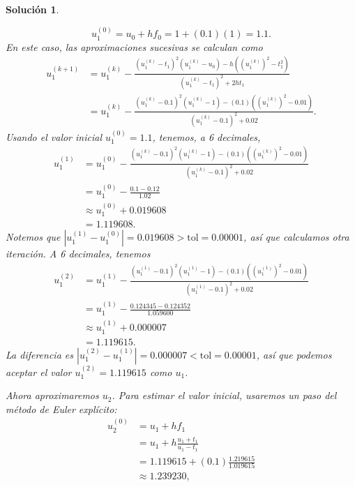 \documentclass[11pt,letterpaper]{article}
\newtheorem*{sol}{Solución}
\newcommand\tol{\mathrm{tol}}
\begin{document}
\begin{sol}
\begin{enumerate}
      \begin{equation}
        u_1^{(0)}=u_0 + h f_0 = 1 + (0.1)(1)=1.1
      .\end{equation}
      En este caso, las aproximaciones sucesivas se calculan como
      \begin{align}
        u_1^{(k+1)}
        &=
          u_{1}^{(k)}
          - \frac
          {
            (u_1^{(k)}-t_1)^{2}(u_{1}^{(k)} - u_{0})
            - h ((u_1^{(k)})^{2}-t_1^{2})
          }
          {
            (u_1^{(k)}-t_1)^{2} + 2ht_1
          }
          \\
        &=
          u_{1}^{(k)}
          - \frac
          {
            (u_1^{(k)}-0.1)^{2}(u_{1}^{(k)} - 1)
            - (0.1) ((u_1^{(k)})^{2}-0.01)
          }
          {
            (u_1^{(k)}-0.1)^{2} + 0.02
          }
      .\end{align}
      Usando el valor inicial $u_1^{(0)}=1.1$, tenemos, a 6
      decimales,
      \begin{align}
        u_1^{(1)}
        &=
          u_1^{(0)}
          - \frac
          {
            (u_1^{(k)}-0.1)^{2}(u_{1}^{(k)} - 1)
            - (0.1) ((u_1^{(k)})^{2}-0.01)
          }
          {
            (u_1^{(k)}-0.1)^{2} + 0.02
          }
          \\
        &= u_1^{(0)} - \frac { 0.1 - 0.12 } { 1.02 } \\
        &\approx
          u_1^{(0)} + 0.019608 \\
        &= 1.119608
      .\end{align}
      Notemos que $|u_{1}^{(1)}-u_1^{(0)}| = 0.019608 > \tol =
      0.00001$, así que calculamos otra iteración. A 6 decimales,
      tenemos
      \begin{align}
        u_1^{(2)}
        &=
          u_{1}^{(1)}
          - \frac
          {
            (u_1^{(1)}-0.1)^{2}(u_{1}^{(1)} - 1)
            - (0.1) ((u_1^{(1)})^{2}-0.01)
          }
          {
            (u_1^{(1)}-0.1)^{2} + 0.02
          }
          \\
        &=
          u_{1}^{(1)} - \frac { 0.124345 - 0.124352} { 1.059600 }
          \\
        &\approx u_{1}^{(1)} + 0.000007 \\
        &= 1.119615
      .\end{align}
      La diferencia es
      $|u_{1}^{(2)}-u_1^{(1)}|=0.000007<\tol=0.00001$, así que
      podemos aceptar el valor $u_1^{(2)}=1.119615$ como $u_1$.

      Ahora aproximaremos $u_2$. Para estimar el valor inicial,
      usaremos un paso del método de Euler explícito:
      \begin{align}
        u_2^{(0)}
        &= u_1 + hf_1 \\
        &= u_1 + h \frac{u_1+t_1}{u_1-t_1} \\
        &= 1.119615 + (0.1)\frac{1.219615}{1.019615} \\
        &\approx 1.239230
      ,\end{align}
      

\end{enumerate}
\end{sol}
\end{document}
